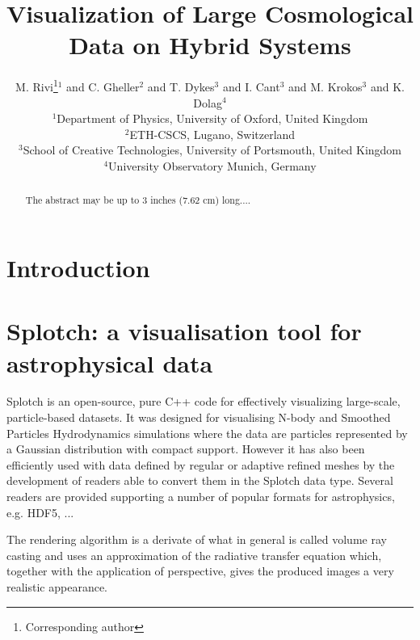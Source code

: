 \documentclass{egpubl}
\title[Visualization of Large Cosmological Data on Hybrid Systems]%
      {Visualization of Large Cosmological Data on Hybrid Systems}
\author[M. Rivi \& C. Gheller \& T. Dykes \& I. Cant \& M. Krokos \& K. Dolag]
       {M. Rivi\thanks{Corresponding author}$^{1}$
        and C. Gheller$^{2}$ and T. Dykes$^{3}$ and I. Cant$^3$ and M. Krokos$^{3}$ and K. Dolag$^{4}$
        \\
         $^1$Department of Physics, University of Oxford, United Kingdom\\
         $^2$ETH-CSCS, Lugano, Switzerland\\
         $^3$School of Creative Technologies, University of Portsmouth, United Kingdom\\
         $^4$University Observatory Munich, Germany
       }
\begin{document}

\maketitle

\begin{abstract}
   The abstract may be up to 3 inches (7.62 cm) long.... 

\begin{classification} %
\end{classification}

\end{abstract}

 
\section{Introduction}

\section{Splotch: a visualisation tool for astrophysical data}

Splotch is an open-source, pure C++ code for effectively visualizing large-scale, particle-based datasets. It was designed for visualising N-body and Smoothed Particles Hydrodynamics simulations where the data are particles represented by a Gaussian distribution with compact support. However it has also been efficiently used with data defined by regular or adaptive refined meshes by the development of readers able to convert them in the Splotch data type. Several readers are provided supporting a number of popular formats for astrophysics, e.g. HDF5, ...

The rendering algorithm is a derivate of what in general is called volume ray casting and uses an approximation of the radiative transfer equation
which, together with the application of perspective, gives the produced images a very realistic appearance. 
\end{document}
